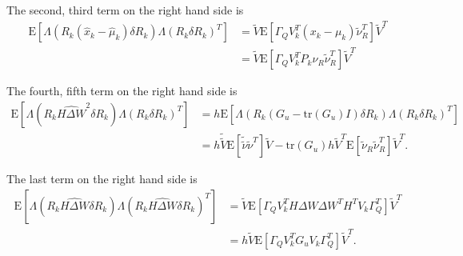 \documentclass[10pt]{article}
\newcommand{\tr}[1]{\ensuremath{\mathrm{tr}\left( #1 \right)}}
\newcommand{\expect}[1]{\ensuremath{\mathrm{E}\left[ #1 \right]}}
\begin{document}
\noindent The second, third term on the right hand side is
\begin{align*}
	\expect{\Lambda(R_k(\hat{x}_k-\hat{\mu}_k)\delta R_k)\Lambda(R_k\delta R_k)^T} &= \tilde{V}\expect{\Gamma_QV_k^T(x_k-\mu_k)\tilde{\nu}_R^T}\tilde{V}^T \\
	&= \tilde{V}\expect{\Gamma_QV_k^TP_k\nu_R\tilde{\nu}_R^T}\tilde{V}^T
\end{align*}

\noindent The fourth, fifth term on the right hand side is
\begin{align*}
	\expect{\Lambda(R_k\widehat{H\Delta W}^2\delta R_k)\Lambda(R_k\delta R_k)^T} &= h\expect{\Lambda(R_k(G_u-\tr{G_u}I)\delta R_k)\Lambda(R_k\delta R_k)^T} \\
	&= h\tilde{\tilde{V}}\expect{\tilde{\tilde{\nu}}\tilde{\nu}^T}\tilde{V} - \tr{G_u}h\tilde{V}^T\expect{\tilde{\nu}_R\tilde{\nu}_R^T}\tilde{V}^T.
\end{align*}

\noindent The last term on the right hand side is
\begin{align*}
	\expect{\Lambda(R_k\widehat{H\Delta W}\delta R_k)\Lambda(R_k\widehat{H\Delta W}\delta R_k)^T} &= \tilde{V}\expect{\Gamma_QV_k^TH\Delta W\Delta W^TH^TV_k\Gamma_Q^T}\tilde{V}^T \\
	&= h\tilde{V}\expect{\Gamma_QV_k^TG_uV_k\Gamma_Q^T}\tilde{V}^T.
\end{align*}
\end{document}
